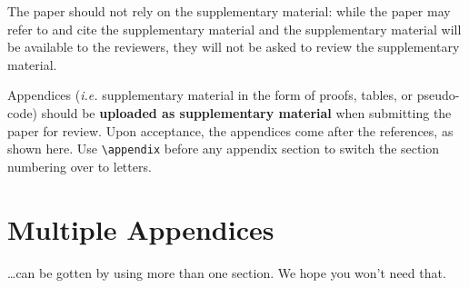 \documentclass[11pt,a4paper]{article}
\begin{document}
The paper should not rely on the supplementary material: while the paper
may refer to and cite the supplementary material and the supplementary material will be available to the
reviewers, they will not be asked to review the
supplementary material.

Appendices ({\em i.e.} supplementary material in the form of proofs, tables,
or pseudo-code) should be {\bf uploaded as supplementary material} when submitting the paper for review.
Upon acceptance, the appendices come after the references, as shown here. Use
\verb|\appendix| before any appendix section to switch the section
numbering over to letters.

\section{Multiple Appendices}
\dots can be gotten by using more than one section. We hope you won't
need that.
\end{document}
